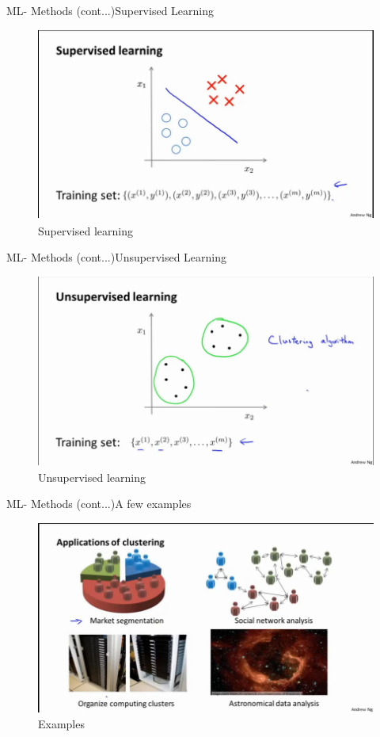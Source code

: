 \documentclass{beamer}
\begin{document}
\begin{frame}{ML- Methods (cont...)}{Supervised Learning}
\begin{figure}
    \centering
    \includegraphics[width=.9\textwidth]{fig/supv.png}
    \caption{Supervised learning}
    \label{fig:Supervised learning}
\end{figure}
\end{frame}
\begin{frame}{ML- Methods (cont...)}{Unsupervised Learning}
    \begin{figure}
        \centering
        \includegraphics[width=.9\textwidth]{fig/uns.png}
        \caption{Unsupervised learning}
        \label{fig:Unsupervised learning}
    \end{figure}
\end{frame}
\begin{frame}{ML- Methods (cont...)}{A few examples}
    \begin{figure}
        \centering
        \includegraphics[width=.9\textwidth]{fig/un-app.png}
        \caption{Examples}
        \label{fig:Examples}
    \end{figure}
\end{frame}
\end{document}
